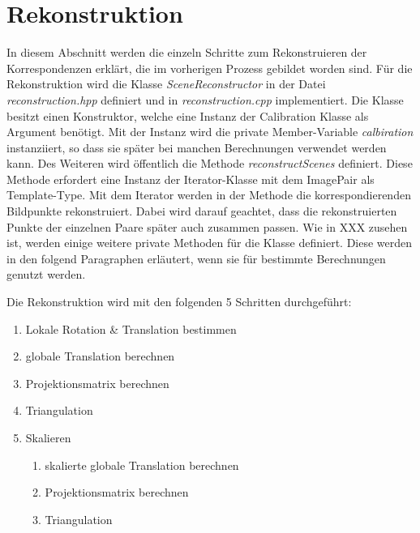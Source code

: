 \section{Rekonstruktion}

In diesem Abschnitt werden die einzeln Schritte zum Rekonstruieren der Korrespondenzen erklärt, die im vorherigen Prozess gebildet worden sind. 
Für die Rekonstruktion wird die Klasse \emph{SceneReconstructor} in der Datei \emph{reconstruction.hpp} definiert und in \emph{reconstruction.cpp} implementiert. 
Die Klasse besitzt einen Konstruktor, welche eine Instanz der Calibration Klasse als Argument benötigt. 
Mit der Instanz wird die private Member-Variable \emph{calbiration} instanziiert, so dass sie später bei manchen Berechnungen verwendet werden kann.
Des Weiteren wird öffentlich die Methode \emph{reconstructScenes} definiert.
Diese Methode erfordert eine Instanz der Iterator-Klasse mit dem ImagePair als Template-Type. %
Mit dem Iterator werden in der Methode die korrespondierenden Bildpunkte rekonstruiert.
Dabei wird darauf geachtet, dass die rekonstruierten Punkte der einzelnen Paare später auch zusammen passen.
Wie in XXX zusehen ist, werden einige weitere private Methoden für die Klasse definiert.
Diese werden in den folgend Paragraphen erläutert, wenn sie für bestimmte Berechnungen genutzt werden.

Die Rekonstruktion wird mit den folgenden 5 Schritten durchgeführt:

\begin{enumerate}
    \item Lokale Rotation \& Translation bestimmen
    \item globale Translation berechnen
    \item Projektionsmatrix berechnen
    \item Triangulation
    \item Skalieren
        \begin{enumerate}
            \item skalierte globale Translation berechnen
            \item Projektionsmatrix berechnen
            \item Triangulation
        \end{enumerate}
\end{enumerate}

